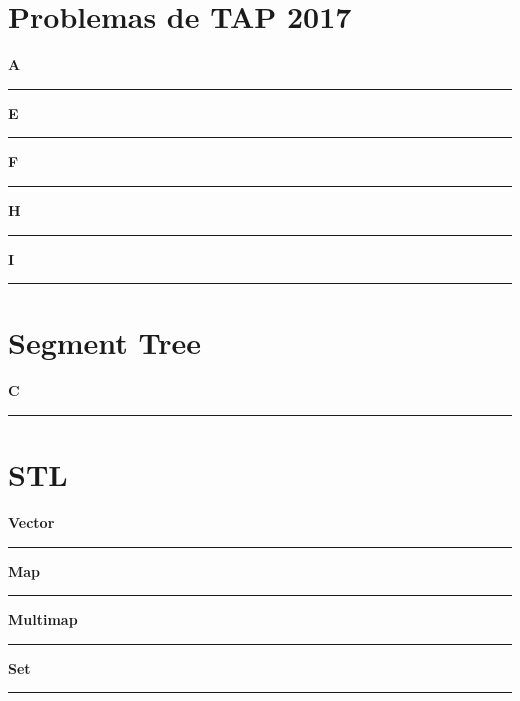 \documentclass[a4paper, 12pt]{article}
\begin{document}
	\section{Problemas de TAP 2017}
		\begin{center}{\Large\bf A}\\\noindent\rule{8cm}{0.4pt}\end{center}
		\newpage
		\begin{center}{\Large\bf E}\\\noindent\rule{8cm}{0.4pt}\end{center}
		\newpage
		\begin{center}{\Large\bf F}\\\noindent\rule{8cm}{0.4pt}\end{center}
		\newpage
		\begin{center}{\Large\bf H}\\\noindent\rule{8cm}{0.4pt}\end{center}
		\newpage
		\begin{center}{\Large\bf I}\\\noindent\rule{8cm}{0.4pt}\end{center}
		\newpage
	\section{Segment Tree}
		\begin{center}{\Large\bf C}\\\noindent\rule{8cm}{0.4pt}\end{center}
		\newpage
	\section{STL}
		\begin{center}{\Large\bf Vector}\\\noindent\rule{8cm}{0.4pt}\end{center}
		\newpage
		\begin{center}{\Large\bf Map}\\\noindent\rule{8cm}{0.4pt}\end{center}
		\newpage
		\begin{center}{\Large\bf Multimap}\\\noindent\rule{8cm}{0.4pt}\end{center}
		\newpage
		\begin{center}{\Large\bf Set}\\\noindent\rule{8cm}{0.4pt}\end{center}
		\newpage
\end{document}
